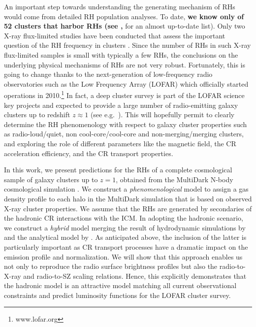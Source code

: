 \documentclass[traditabstract]{aa}
\def\C#1{{\bf #1}}
\begin{document}
An important step towards understanding the generating mechanism of RHs would
come from detailed RH population analyses. To date, \C{we know only of 52 clusters
that harbor RHs (see \citealp{2012A&ARv..20...54F},} for an almost up-to-date
list). Only two X-ray flux-limited studies have been conducted that assess the
important question of the RH frequency in clusters \citep{1999NewA....4..141G,
  VenturiGMRT_2}. Since the number of RHs in such X-ray flux-limited samples is
small with typically a few RHs, the conclusions on the underlying physical
mechanisms of RHs are not very robust. Fortunately, this is going to change
thanks to the next-generation of low-frequency radio observatories such as the
Low Frequency Array (LOFAR) which officially started operations in
2010.\footnote{www.lofar.org} In fact, a deep cluster survey is part of the
LOFAR science key projects and expected to provide a large number of
radio-emitting galaxy clusters up to redshift $z\approx1$ (see
e.g.~\citealp{2010A&A...509A..68C,2012JApA..tmp...34R}).  This will hopefully
permit to clearly determine the RH phenomenology with respect to galaxy cluster
properties such as radio-loud/quiet, non cool-core/cool-core and
non-merging/merging clusters, and exploring the role of different parameters
like the magnetic field, the CR acceleration efficiency, and the CR transport
properties.

In this work, we present predictions for the RHs of a complete cosmological
sample of galaxy clusters up to $z= 1$, obtained from the MultiDark N-body
cosmological simulation \citep{2011arXiv1104.5130P}. We construct a
\emph{phenomenological} model to assign a gas density profile to each halo in
the MultiDark simulation that is based on observed X-ray cluster properties. We
assume that the RHs are generated by secondaries of the hadronic CR interactions
with the ICM. In adopting the hadronic scenario, we construct a \emph{hybrid}
model merging the result of hydrodynamic simulations by
\cite{2010MNRAS.409..449P} and the analytical model by
\cite{2011A&A...527A..99E}.  As anticipated above, the inclusion of the latter
is particularly important as CR transport processes have a dramatic impact on
the emission profile and normalization. We will show that this approach enables
us not only to reproduce the radio surface brightness profiles but also the
radio-to-X-ray and radio-to-SZ scaling relations. Hence, this explicitly
demonstrates that the hadronic model is an attractive model matching all current
observational constraints and predict luminosity functions for the LOFAR cluster
survey.
\end{document}
